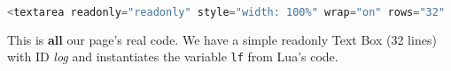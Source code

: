 \begin{lstlisting}[language=javascript,caption={HTML - Log Code (IV)}]
<textarea readonly="readonly" style="width: 100%" wrap="on" rows="32"        id="log"><%=lf:pcdata()%></textarea>
\end{lstlisting}

This is \textbf{all} our page's real code. We have a simple readonly Text Box (32 lines) with ID \textit{log} and instantiates the variable \texttt{lf} from Lua's code.